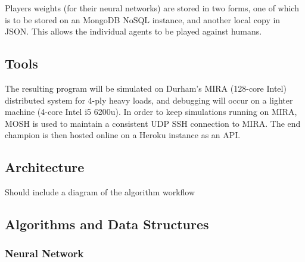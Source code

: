 \documentclass[12pt,a4paper]{article}
\begin{document}
Players weights (for their neural networks) are stored in two forms, one of which is to be stored on an MongoDB NoSQL instance, and another local copy in JSON. This allows the individual agents to be played against humans.

\subsection*{Tools}

The resulting program will be simulated on Durham's MIRA (128-core Intel) distributed system for 4-ply heavy loads, and debugging will occur on a lighter machine (4-core Intel i5 6200u). In order to keep simulations running on MIRA, MOSH is used to maintain a consistent UDP SSH connection to MIRA. The end champion is then hosted online on a Heroku instance as an API.

\subsection*{Architecture}

Should include a diagram of the algorithm workflow


\subsection*{Algorithms and Data Structures}

\subsubsection{Neural Network}
\end{document}
